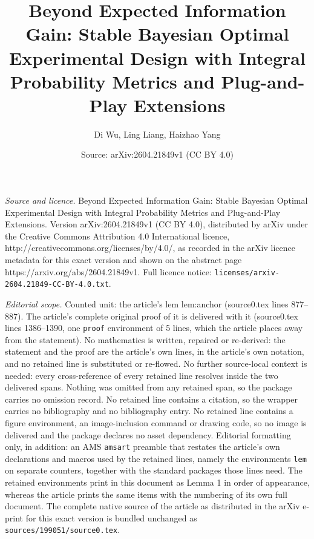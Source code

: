 \documentclass[10pt,a4paper]{amsart}
\title{Beyond Expected Information Gain: Stable Bayesian Optimal Experimental Design with Integral Probability Metrics and Plug-and-Play Extensions}
\author{Di Wu, Ling Liang, Haizhao Yang}
\date{Source: arXiv:2604.21849v1 (CC BY 4.0)}
\begin{document}
\maketitle

\noindent\emph{Source and licence.} Beyond Expected Information Gain: Stable Bayesian Optimal Experimental Design with Integral Probability Metrics and Plug-and-Play Extensions. Version arXiv:2604.21849v1 (CC BY 4.0), distributed by arXiv under the Creative Commons Attribution 4.0 International licence, http://creativecommons.org/licenses/by/4.0/, as recorded in the arXiv licence metadata for this exact version and shown on the abstract page https://arxiv.org/abs/2604.21849v1. Full licence notice: \texttt{licenses/arxiv-2604.21849-CC-BY-4.0.txt}.\par\smallskip

\noindent\textit{Editorial scope.} Counted unit: the article's lem lem:anchor (source0.tex lines 877--887). The article's complete original proof of it is delivered with it (source0.tex lines 1386--1390, one \texttt{proof} environment of 5 lines, which the article places away from the statement). No mathematics is written, repaired or re-derived: the statement and the proof are the article's own lines, in the article's own notation, and no retained line is substituted or re-flowed.  No further source-local context is needed: every cross-reference of every retained line resolves inside the two delivered spans.  Nothing was omitted from any retained span, so the package carries no omission record.  No retained line contains a citation, so the wrapper carries no bibliography and no bibliography entry.  No retained line contains a figure environment, an image-inclusion command or drawing code, so no image is delivered and the package declares no asset dependency.  Editorial formatting only, in addition: an AMS \texttt{amsart} preamble that restates the article's own declarations and macros used by the retained lines, namely the environments \texttt{lem} on separate counters, together with the standard packages those lines need.  The retained environments print in this document as Lemma 1 in order of appearance, whereas the article prints the same items with the numbering of its own full document.  The complete native source of the article as distributed in the arXiv e-print for this exact version is bundled unchanged as \texttt{sources/199051/source0.tex}.
\end{document}
